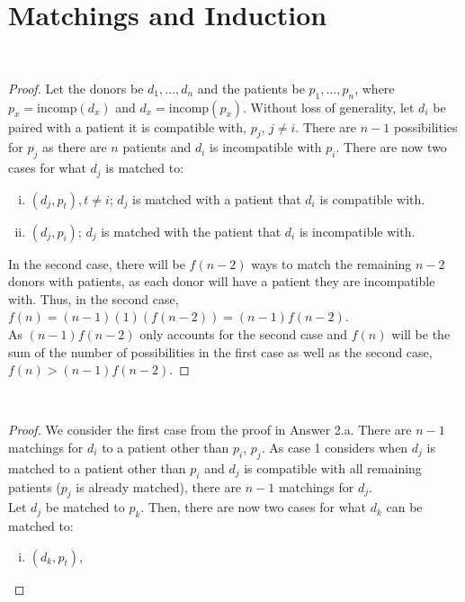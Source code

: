 \documentclass[11pt]{scrartcl}
\theoremstyle{dotlessP}
\theoremstyle{dotlessN}
\begin{document}
\section{Matchings and Induction}
\begin{ans}
\
	\begin{proof}
		Let the donors be $d_1, \dots, d_n$ and the patients be $p_1, \dots, p_n$, where $p_x = \text{incomp}(d_x)$ and $d_x = \text{incomp}(p_x)$. Without loss of generality, let $d_i$ be paired with a patient it is compatible with, $p_j$, $j \neq i$. There are $n-1$ possibilities for $p_j$ as there are $n$ patients and $d_i$ is incompatible with $p_i$. There are now two cases for what $d_j$ is matched to: 
\begin{enumerate}[i)]
	\item $(d_j, p_t), t \neq i$; $d_j$ is matched with a patient that $d_i$ is compatible with.
	\item $(d_j, p_i)$; $d_j$ is matched with the patient that  $d_i$ is incompatible with.
\end{enumerate}
In the second case, there will be $f(n-2)$ ways to match the remaining $n-2$ donors with patients, as each donor will have a patient they are incompatible with. Thus, in the second case,  $f(n) = (n-1)(1)(f(n-2)) = (n-1)f(n-2)$.
\\

As  $(n-1)f(n-2)$ only accounts for the second case and $f(n)$ will be the sum of the number of possibilities in the first case as well as the second case,  $f(n) > (n-1)f(n-2)$.
	\end{proof}
\end{ans}
\begin{ans}
\
	\begin{proof}
		We consider the first case from the proof in Answer 2.a. There are $n-1$ matchings for $d_i$ to a patient other than $p_i$, $p_j$. As case 1 considers when  $d_j$ is matched to a patient other than $p_i$ and  $d_j$ is compatible with all remaining patients ($p_j$ is already matched), there are $n-1$ matchings for $d_j$. 
\\

		Let $d_j$ be matched to $p_k$. Then, there are now two cases for what  $d_k$ can be matched to:
		\begin{enumerate}[i)]
			\item $(d_k, p_t)$, 
		\end{enumerate}
	\end{proof}
\end{ans}
\end{document}
